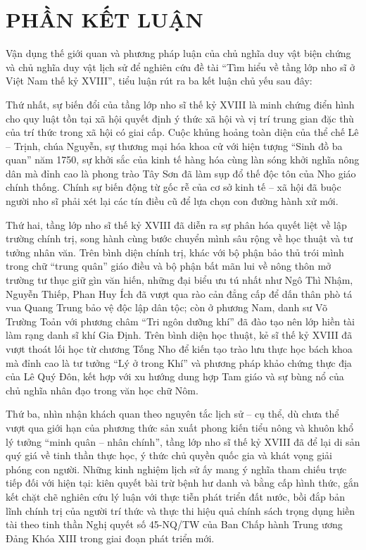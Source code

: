 \section*{PHẦN KẾT LUẬN}

Vận dụng thế giới quan và phương pháp luận của chủ nghĩa duy vật biện chứng và chủ nghĩa duy vật lịch sử để nghiên cứu đề tài ``Tìm hiểu về tầng lớp nho sĩ ở Việt Nam thế kỷ XVIII'', tiểu luận rút ra ba kết luận chủ yếu sau đây:

Thứ nhất, sự biến đổi của tầng lớp nho sĩ thế kỷ XVIII là minh chứng điển hình cho quy luật tồn tại xã hội quyết định ý thức xã hội và vị trí trung gian đặc thù của trí thức trong xã hội có giai cấp. Cuộc khủng hoảng toàn diện của thể chế Lê -- Trịnh, chúa Nguyễn, sự thương mại hóa khoa cử với hiện tượng ``Sinh đồ ba quan'' năm 1750, sự khởi sắc của kinh tế hàng hóa cùng làn sóng khởi nghĩa nông dân mà đỉnh cao là phong trào Tây Sơn đã làm sụp đổ thế độc tôn của Nho giáo chính thống. Chính sự biến động từ gốc rễ của cơ sở kinh tế -- xã hội đã buộc người nho sĩ phải xét lại các tín điều cũ để lựa chọn con đường hành xử mới.

Thứ hai, tầng lớp nho sĩ thế kỷ XVIII đã diễn ra sự phân hóa quyết liệt về lập trường chính trị, song hành cùng bước chuyển mình sâu rộng về học thuật và tư tưởng nhân văn. Trên bình diện chính trị, khác với bộ phận bảo thủ trói mình trong chữ ``trung quân'' giáo điều và bộ phận bất mãn lui về nông thôn mở trường tư thục giữ gìn văn hiến, những đại biểu ưu tú nhất như Ngô Thì Nhậm, Nguyễn Thiếp, Phan Huy Ích đã vượt qua rào cản đẳng cấp để dấn thân phò tá vua Quang Trung bảo vệ độc lập dân tộc; còn ở phương Nam, danh sư Võ Trường Toản với phương châm ``Tri ngôn dưỡng khí'' đã đào tạo nên lớp hiền tài làm rạng danh sĩ khí Gia Định. Trên bình diện học thuật, kẻ sĩ thế kỷ XVIII đã vượt thoát lối học từ chương Tống Nho để kiến tạo trào lưu thực học bách khoa mà đỉnh cao là tư tưởng ``Lý ở trong Khí'' và phương pháp khảo chứng thực địa của Lê Quý Đôn, kết hợp với xu hướng dung hợp Tam giáo và sự bùng nổ của chủ nghĩa nhân đạo trong văn học chữ Nôm.

Thứ ba, nhìn nhận khách quan theo nguyên tắc lịch sử -- cụ thể, dù chưa thể vượt qua giới hạn của phương thức sản xuất phong kiến tiểu nông và khuôn khổ lý tưởng ``minh quân -- nhân chính'', tầng lớp nho sĩ thế kỷ XVIII đã để lại di sản quý giá về tinh thần thực học, ý thức chủ quyền quốc gia và khát vọng giải phóng con người. Những kinh nghiệm lịch sử ấy mang ý nghĩa tham chiếu trực tiếp đối với hiện tại: kiên quyết bài trừ bệnh hư danh và bằng cấp hình thức, gắn kết chặt chẽ nghiên cứu lý luận với thực tiễn phát triển đất nước, bồi đắp bản lĩnh chính trị của người trí thức và thực thi hiệu quả chính sách trọng dụng hiền tài theo tinh thần Nghị quyết số 45-NQ/TW của Ban Chấp hành Trung ương Đảng Khóa XIII trong giai đoạn phát triển mới.

